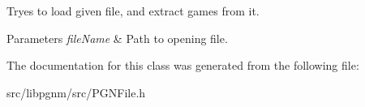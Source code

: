 Tryes to load given file, and extract games from it. 


\begin{DoxyParams}{Parameters}
{\em fileName} & Path to opening file. \\
\hline
\end{DoxyParams}


The documentation for this class was generated from the following file:\begin{DoxyCompactItemize}
\item 
src/libpgnm/src/PGNFile.h\end{DoxyCompactItemize}
